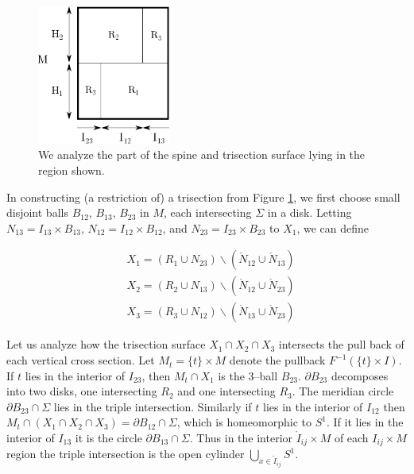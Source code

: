 \documentclass[12pt]{amsart}
\newcommand{\del}{\partial }
\theoremstyle{definition}
\theoremstyle{remark}
\begin{document}
\begin{figure}[h]
\centering
\includegraphics[height=1.8in]{MxS1_section.png}
\caption{We analyze the part of the spine and trisection surface lying in the region shown.}
\label{sectionbreakdown}
\end{figure}

In constructing (a restriction of) a trisection from Figure \ref{sectionbreakdown}, we first choose small disjoint balls $B_{12}$, $B_{13}$, $B_{23}$ in $M$, each intersecting $\Sigma$ in a disk.
Letting $N_{13} = I_{13} \times B_{13}$, $N_{12} = I_{12} \times B_{12}$, and $N_{23} = I_{23} \times B_{23}$ to $X_1$, we can define

\begin{align*}
&X_1 = (R_1 \cup N_{23}) \backslash (\mathring N_{12} \cup \mathring N_{13}) \\
&X_2 = (R_2 \cup N_{13}) \backslash (\mathring N_{12} \cup \mathring N_{23}) \\
&X_3 = (R_3 \cup N_{12}) \backslash (\mathring N_{13} \cup \mathring N_{23})
\end{align*}

Let us analyze how the trisection surface $X_1 \cap X_2 \cap X_3$ intersects the pull back of each vertical cross section.
Let $M_t = \{t\} \times M$ denote the pullback $F^{-1}(\{t\} \times I)$.
If $t$ lies in the interior of $I_{23}$, then $M_t \cap X_1$ is the 3--ball $B_{23}$.
$\del B_{23}$ decomposes into two disks, one intersecting $R_2$ and one intersecting $R_3$.
The meridian circle $\del B_{23} \cap \Sigma$ lies in the triple intersection.
Similarly if $t$ lies in the interior of $I_{12}$ then $M_t \cap (X_1 \cap X_2 \cap X_3) = \del B_{12} \cap \Sigma$, which is homeomorphic to $S^1$.
If it lies in the interior of $I_{13}$ it is the circle $\del B_{13} \cap \Sigma$.
Thus in the interior $\mathring I_{ij} \times M$ of each $I_{ij} \times M$ region the triple intersection is the open cylinder $\bigcup_{x \in \mathring I_{ij}} S^1$.
\end{document}
